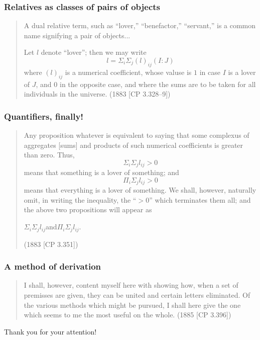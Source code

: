 \documentclass[compress,12pt]{beamer}
\begin{document}
\begin{frame}
    \frametitle{Relatives as classes of pairs of objects}
    \begin{quote}{\setlength{\abovedisplayskip}{0pt}
        \setlength{\belowdisplayskip}{0pt}
        A dual relative term, such as ``lover,'' ``benefactor,'' ``servant,'' is a common name signifying a pair of objects...

        Let $l$ denote ``lover''; then we may write
        $$l=\Sigma_i\Sigma_j(l)_{ij}(I:J)$$
        where $(l)_{ij}$ is a numerical coefficient, whose valuse is $1$ in case $I$ is a lover of $J$, and $0$ in the opposite case, and where the sums are to be taken for all individuals in the universe.
        (1883 [CP 3.328--9])}
    \end{quote}
\end{frame}

\begin{frame}
    \frametitle{Quantifiers, finally!}
    \begin{quote}{\setlength{\abovedisplayskip}{0pt}
        \setlength{\belowdisplayskip}{0pt}
        Any proposition whatever is equivalent to saying that some complexus of aggregates [sums] and products of such numerical coefficients is greater than zero. Thus,
        $$\Sigma_i\Sigma_jl_{ij}>0$$
        means that something is a lover of something; and
        $$\Pi_i\Sigma_jl_{ij}>0$$
        means that everything is a lover of something. We shall, however, naturally omit, in writing the inequality, the ``$>0$'' which terminates them all; and the above two propositions will appear as
        \begin{center}
            $\Sigma_i\Sigma_jl_{ij}$\quad and\quad $\Pi_i\Sigma_jl_{ij}$.
        \end{center}(1883 [CP 3.351])}
    \end{quote}
\end{frame}

\begin{frame}
    \frametitle{A method of derivation}
    \begin{quote}
        I shall, however, content myself here with showing how, when a set of premisses are given, they can be united
        and certain letters eliminated. Of the various methods which
        might be pursued, I shall here give the one which seems to me
        the most useful on the whole. (1885 [CP 3.396])
    \end{quote}
\end{frame}

\End

\begin{frame}
      \centering\large
      Thank you for your attention!
      
\end{frame}
\end{document}
